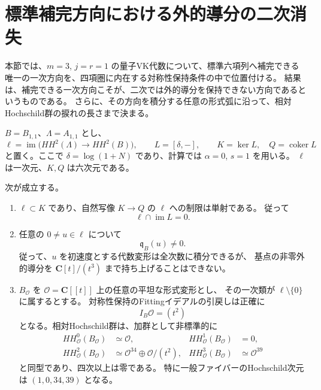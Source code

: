\section{標準補完方向における外的導分の二次消失}
\label{sec:vk-completion-symmetry-v38}

本節では、$m=3$, $j=r=1$ の量子VK代数について、標準六項列へ補完できる
唯一の一次方向を、四項圏に内在する対称性保持条件の中で位置付ける。
結果は、補完できる一次方向こそが、二次では外的導分を保持できない方向であるというものである。
さらに、その方向を積分する任意の形式弧に沿って、相対Hochschild群の捩れの長さまで決まる。

$B=B_{1,1}$、$\Lambda=A_{1,1}$ とし、
\[
 \ell=\operatorname{im}\bigl(HH^2(\Lambda)\longrightarrow HH^2(B)\bigr),
 \qquad L=[\delta,-],\qquad
 K=\ker L,\quad Q=\operatorname{coker}L
\]
と置く。ここで $\delta=\log(1+N)$ であり、計算では $\alpha=0$, $s=1$ を用いる。
$\ell$ は一次元、$K,Q$ は六次元である。

\begin{theorem}[補完接線と内在的二次障害]
\label{thm:vk-completion-secondary-v38}
次が成立する。
\begin{enumerate}
\item $\ell\subset K$ であり、自然写像 $K\to Q$ の $\ell$ への制限は単射である。
 従って
 \[
  \ell\cap\operatorname{im}L=0.
 \]
\item 任意の $0\ne u\in\ell$ について
 \[
  \mathfrak q_B(u)\ne0.
 \]
 従って、$u$ を初速度とする代数変形は全次数に積分できるが、
 基点の非零外的導分を $\mathbf C[t]/(t^3)$ まで持ち上げることはできない。
\item $B_{\mathcal O}$ を $\mathcal O=\mathbf C[[t]]$ 上の任意の平坦な形式変形とし、
 その一次類が $\ell\setminus\{0\}$ に属するとする。
 対称性保持のFittingイデアルの引戻しは正確に
 \begin{equation}
  I_B\mathcal O=(t^2)
  \label{eq:completion-arc-Fitting-v38}
 \end{equation}
 となる。相対Hochschild群は、加群として非標準的に
 \begin{equation}
 \begin{aligned}
 HH^0_{\mathcal O}(B_{\mathcal O})&\simeq\mathcal O,&
 HH^1_{\mathcal O}(B_{\mathcal O})&=0,\\
 HH^2_{\mathcal O}(B_{\mathcal O})&\simeq
       \mathcal O^{34}\oplus\mathcal O/(t^2),&
 HH^3_{\mathcal O}(B_{\mathcal O})&\simeq\mathcal O^{39}
 \end{aligned}
 \label{eq:completion-arc-relative-HH-v38}
 \end{equation}
 と同型であり、四次以上は零である。
 特に一般ファイバーのHochschild次元は $(1,0,34,39)$ となる。
\end{enumerate}
\end{theorem}

